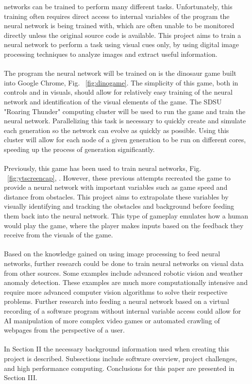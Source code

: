  networks can be trained to perform many different tasks. Unfortunately, this training often requires direct access to internal variables of the program the neural network is being trained with, which are often unable to be monitored directly unless the original source code is available. This project aims to train a neural network to perform a task using visual cues only, by using digital image processing techniques to analyze images and extract useful information. 
\\\\
The program the neural network will be trained on is the dinosaur game built into Google Chrome, Fig. ~\ref{fig:dinogame}. The simplicity of this game, both in controls and in visuals, should allow for relatively easy training of the neural network and identification of the visual elements of the game. The SDSU "Roaring Thunder" computing cluster \cite{SDState_HPC} will be used to run the game and train the neural network. Parallelizing this task is necessary to quickly create and simulate each generation so the network can evolve as quickly as possible. Using this cluster will allow for each node of a given generation to be run on different cores, speeding up the process of generation significantly.
\\\\
Previously, this game has been used to train neural networks, Fig. ~\ref{fig:ytscreencap},  \cite{Dino_AI}. However, these previous attempts recreated the game to provide a neural network with important variables such as game speed and distance from obstacles. This project aims to extrapolate these variables by visually identifying and tracking the obstacles and background before feeding them back into the neural network. This type of gameplay emulates how a human would play the game, where the player makes inputs based on the feedback they receive from the visuals of the game.
\\\\
Based on the knowledge gained on using image processing to feed neural networks, further research could be done to train neural networks on visual data from other sources. Some examples include advanced robotic vision and weather anomaly detection. These examples are much more computationally intensive and require more advanced computer vision algorithms to solve their respective problems. Further research into feeding a neural network based on a virtual recording of a software program without internal variable access could allow for AI manipulation of more complex video games or automated crawling of webpages from the perspective of a user.
\\\\
In Section II the necessary background information used when creating this project is described. Subsections include software overview, project challenges, and high performance computing. Conclusions for this paper are presented in Section III.


